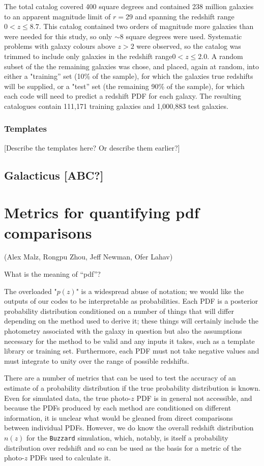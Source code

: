 \documentclass[usenatbib]{mn2e}
\begin{document}
The total catalog covered 400 square degrees and contained 238 million galaxies to an apparent magnitude limit of $r\!=\!29$ and spanning the redshift range $0\!<\!z\!\leq\!8.7$.  This catalog contained two orders of magnitude more galaxies than were needed for this study, so only $\sim\!8$ square degrees were used.  Systematic problems with galaxy colours above $z\!>\!2$ were observed, so the catalog was trimmed to include only galaxies in the redshift range$0\!<\!z\!\leq\!2.0$.  A random subset of the the remaining galaxies was chose, and placed, again at random, into either a "training'' set (10\% of the sample), for which the galaxies true redshifts will be supplied, or a "test'' set (the remaining 90\% of the sample), for which each code will need to predict a redshift PDF for each galaxy. The resulting catalogues contain 111,171 training galaxies and 1,000,883 test galaxies.

\subsubsection{Templates}\label{sec:buzztemplates}
[Describe the templates here? Or describe them earlier?]

\subsection{Galacticus [ABC?]}\label{Galacticus}

\section{Metrics for quantifying pdf comparisons}\label{metrics}

(Alex Malz, Rongpu Zhou, Jeff Newman, Ofer Lahav)

What is the meaning of “pdf”? 

The overloaded "$p(z)$" is a widespread abuse of notation; we would like the outputs of our codes to be interpretable as probabilities.  Each PDF is a posterior probability distribution conditioned on a number of things that will differ depending on the method used to derive it; these things will certainly include the photometry associated with the galaxy in question but also the assumptions necessary for the method to be valid and any inputs it takes, such as a template library or training set.  Furthermore, each PDF must not take negative values and must integrate to unity over the range of possible redshifts.

There are a number of metrics that can be used to test the accuracy of an estimate of a probability distribution if the true probability distribution is known.  Even for simulated data, the true photo-$z$ PDF is in general not accessible, and because the PDFs produced by each method are conditioned on different information, it is unclear what would be gleaned from direct comparisons between individual PDFs.  However, we do know the overall redshift distribution $n(z)$ for the \texttt{Buzzard} simulation, which, notably, is itself a probability distribution over redshift and so can be used as the basis for a metric of the photo-$z$ PDFs used to calculate it.  
\end{document}
